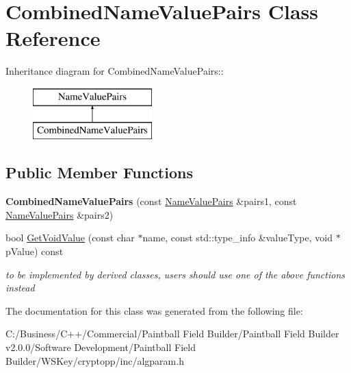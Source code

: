 \hypertarget{class_combined_name_value_pairs}{
\section{CombinedNameValuePairs Class Reference}
\label{class_combined_name_value_pairs}
}
Inheritance diagram for CombinedNameValuePairs::\begin{figure}[H]
\begin{center}
\leavevmode
\includegraphics[height=2cm]{class_combined_name_value_pairs}
\end{center}
\end{figure}
\subsection*{Public Member Functions}
\begin{DoxyCompactItemize}
\item 
\hypertarget{class_combined_name_value_pairs_a28426a5441714ae5dab30c45d87e0726}{
{\bfseries CombinedNameValuePairs} (const \hyperlink{class_name_value_pairs}{NameValuePairs} \&pairs1, const \hyperlink{class_name_value_pairs}{NameValuePairs} \&pairs2)}
\label{class_combined_name_value_pairs_a28426a5441714ae5dab30c45d87e0726}

\item 
\hypertarget{class_combined_name_value_pairs_a4bc3fa734155cdbb116d3020b697e7ab}{
bool \hyperlink{class_combined_name_value_pairs_a4bc3fa734155cdbb116d3020b697e7ab}{GetVoidValue} (const char $\ast$name, const std::type\_\-info \&valueType, void $\ast$pValue) const }
\label{class_combined_name_value_pairs_a4bc3fa734155cdbb116d3020b697e7ab}

\begin{DoxyCompactList}\small\item\em to be implemented by derived classes, users should use one of the above functions instead \item\end{DoxyCompactList}\end{DoxyCompactItemize}


The documentation for this class was generated from the following file:\begin{DoxyCompactItemize}
\item 
C:/Business/C++/Commercial/Paintball Field Builder/Paintball Field Builder v2.0.0/Software Development/Paintball Field Builder/WSKey/cryptopp/inc/algparam.h\end{DoxyCompactItemize}
